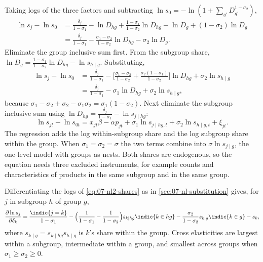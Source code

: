 Taking logs of the three factors and subtracting $\ln s_0 = -\ln(1 + \sum_{g'}D_{g'}^{1-\sigma_2})$,
\begin{align*}
\ln s_j - \ln s_0 &= \frac{\delta_j}{1-\sigma_1} - \ln D_{hg} + \frac{1-\sigma_1}{1-\sigma_2}\ln D_{hg} - \ln D_g + (1-\sigma_2)\ln D_g \\
&= \frac{\delta_j}{1-\sigma_1} - \frac{\sigma_1 - \sigma_2}{1-\sigma_2}\ln D_{hg} - \sigma_2\ln D_g .
\end{align*}
Eliminate the group inclusive sum first. From the subgroup share,
$\ln D_g = \frac{1-\sigma_1}{1-\sigma_2}\ln D_{hg} - \ln s_{h \mid g}$. Substituting,
\begin{align*}
\ln s_j - \ln s_0 &= \frac{\delta_j}{1-\sigma_1} - \Big[\frac{\sigma_1 - \sigma_2}{1-\sigma_2} + \frac{\sigma_2(1-\sigma_1)}{1-\sigma_2}\Big]\ln D_{hg} + \sigma_2\ln s_{h \mid g} \\
&= \frac{\delta_j}{1-\sigma_1} - \sigma_1\ln D_{hg} + \sigma_2\ln s_{h \mid g} ,
\end{align*}
because $\sigma_1 - \sigma_2 + \sigma_2 - \sigma_1\sigma_2 = \sigma_1(1-\sigma_2)$. Next eliminate the subgroup inclusive
sum using $\ln D_{hg} = \frac{\delta_j}{1-\sigma_1} - \ln s_{j \mid hg}$:
\begin{equation}\label{eq:07-nl2-regression}
\ln s_{jt} - \ln s_{0t} = x_{jt}\beta - \alpha p_{jt} + \sigma_1\ln s_{j \mid hg, t} + \sigma_2\ln s_{h \mid g, t} + \xi_{jt} .
\end{equation}
The regression adds the log within-subgroup share and the log subgroup share within the group. When
$\sigma_1 = \sigma_2 = \sigma$ the two terms combine into $\sigma\ln s_{j \mid g}$, the one-level model with groups as
nests. Both shares are endogenous, so the equation needs three excluded instruments, for example counts and
characteristics of products in the same subgroup and in the same group.

Differentiating the logs of \eqref{eq:07-nl2-shares} as in \cref{sec:07-nl-substitution} gives, for $j$ in
subgroup $h$ of group $g$,
\begin{equation*}
\frac{\partial\ln s_j}{\partial\delta_k} = \frac{\indic\{j = k\}}{1-\sigma_1}
- \Big(\frac{1}{1-\sigma_1} - \frac{1}{1-\sigma_2}\Big)s_{k \mid hg}\indic\{k \in hg\}
- \frac{\sigma_2}{1-\sigma_2}s_{k \mid g}\indic\{k \in g\} - s_k ,
\end{equation*}
where $s_{k \mid g} = s_{k \mid hg}s_{h \mid g}$ is $k$'s share within the group. Cross elasticities are largest within
a subgroup, intermediate within a group, and smallest across groups when $\sigma_1 \ge \sigma_2 \ge 0$.

